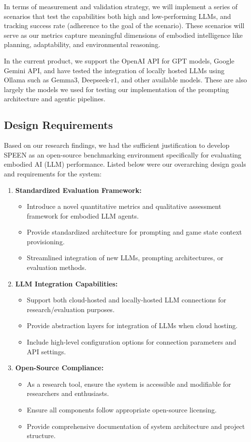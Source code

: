 \documentclass{article}
\begin{document}
In terms of measurement and validation strategy, we will implement a series of scenarios that test the capabilities both high and low-performing LLMs, and tracking success rate (adherence to the goal of the scenario).
These scenarios will serve as our metrics capture meaningful dimensions of embodied intelligence like planning, adaptability, and environmental reasoning.

In the current product, we support the OpenAI API for GPT models, Google Gemini API, and have tested the integration of locally hosted LLMs using Ollama such as Gemma3, Deepseek-r1, and other available models.
These are also largely the models we used for testing our implementation of the prompting architecture and agentic pipelines.

\subsection{Design Requirements}
Based on our research findings, we had the sufficient justification to develop SPEEN as an open-source benchmarking environment specifically for evaluating embodied AI (LLM) performance.
Listed below were our overarching design goals and requirements for the system:
\begin{enumerate}
    \item \textbf{Standardized Evaluation Framework:}
        \begin{itemize}
            \item Introduce a novel quantitative metrics and qualitative assessment framework for embodied LLM agents.
            \item Provide standardized architecture for prompting and game state context provisioning.
            \item Streamlined integration of new LLMs, prompting architectures, or evaluation methods.
        \end{itemize}
    \item \textbf{LLM Integration Capabilities:}
        \begin{itemize}
            \item Support both cloud-hosted and locally-hosted LLM connections for research/evaluation purposes.
            \item Provide abstraction layers for integration of LLMs when cloud hosting.
            \item Include high-level configuration options for connection parameters and API settings.
        \end{itemize}
    \item \textbf{Open-Source Compliance:}
        \begin{itemize}
            \item As a research tool, ensure the system is accessible and modifiable for researchers and enthusiasts.
            \item Ensure all components follow appropriate open-source licensing.
            \item Provide comprehensive documentation of system architecture and project structure.
        \end{itemize}
\end{enumerate}
\end{document}
